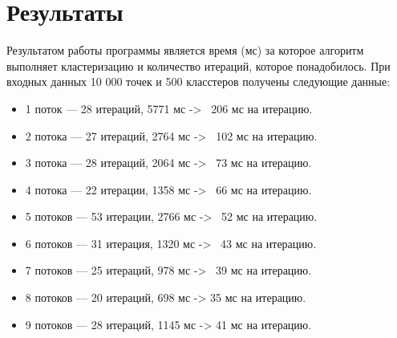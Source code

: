 \section{Результаты}

Результатом работы программы является время (мс) за которое алгоритм выполняет кластеризацию и количество итераций, которое понадобилось.
При входных данных 10 000 точек и 500 класстеров получены следующие данные:
\begin{itemize}
\item 1 поток --- 28 итераций, 5771 мс -> ~206 мс на итерацию.
\item 2 потока --- 27 итераций, 2764 мс -> ~102 мс на итерацию.
\item 3 потока --- 28 итераций, 2064 мс -> ~73 мс на итерацию.
\item 4 потока --- 22 итерации, 1358 мс -> ~66 мс на итерацию.
\item 5 потоков --- 53 итерации, 2766 мс -> ~52 мс на итерацию.
\item 6 потоков --- 31 итерация, 1320 мс -> ~43 мс на итерацию.
\item 7 потоков --- 25 итераций, 978 мс -> ~39 мс на итерацию.
\item 8 потоков --- 20 итераций, 698 мс -> 35 мс на итерацию.
\item 9 потоков --- 28 итераций, 1145 мс -> 41 мс на итерацию.
\end{itemize}
